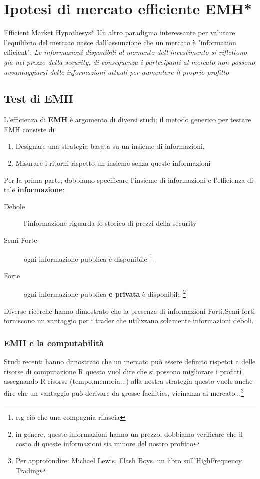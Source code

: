 \documentclass[a4paper,11pt]{report}
\begin{document}
{\section{Ipotesi di mercato efficiente EMH*}
	{\tiny{Efficient Market Hypothesys*}} \newline
	Un altro paradigma interessante per valutare l'equilibrio del mercato nasce dall'assunzione che un mercato è "information efficient": \newline
	\emph{ Le informazioni disponibili al momento dell'investimento si riflettono gia nel prezzo della security, di consequenza i partecipanti al mercato non possono avvantaggiarsi delle informazioni attuali per aumentare il proprio profitto}

\subsection{Test di EMH}
	L'efficienza di \textbf{EMH} è argomento di diversi studi; \newline
	il metodo generico per testare EMH consiste di
\begin{enumerate}
	\item Designare una strategia basata su un insieme di informazioni,
	\item Misurare i ritorni rispetto un insieme senza queste informazioni
\end{enumerate}
	Per la prima parte, dobbiamo specificare l'insieme di informazioni e l'efficienza di tale \textbf{informazione}:
\begin{description}
	\item[Debole] l'informazione riguarda lo storico di prezzi della security
	\item[Semi-Forte] ogni informazione pubblica è disponibile \footnote{e.g ciò che una compagnia rilascia}
	\item[Forte] ogni informazione pubblica \textbf{e privata} è disponibile \footnote{in genere, queste informazioni hanno un prezzo, dobbiamo verificare che il costo di queste informazioni sia minore del nostro profitto}
\end{description}
	Diverse ricerche hanno dimostrato che la presenza di informazioni Forti,Semi-forti forniscono un vantaggio per i trader che 		utilizzano solamente informazioni deboli. \newline
\subsubsection{EMH e la computabilità}
	Studi recenti hanno dimostrato che un mercato può essere definito rispetot a delle risorse di computazione R
	questo vuol dire che si possono migliorare i profitti assegnando R risorse (tempo,memoria...) alla nostra strategia
	questo vuole anche dire che un vantaggio può derivare da grosse facilities, vicinanza al mercato...\footnote{Per approfondire: Michael Lewis, Flash Boys. un libro sull'HighFrequency Trading} %
\newpage

}
\end{document}
